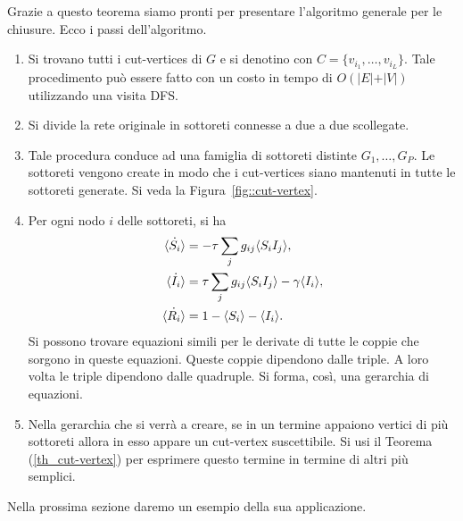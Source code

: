 Grazie a questo teorema siamo pronti per presentare l'algoritmo generale per le chiusure. Ecco i passi dell'algoritmo.
\begin{enumerate}
	\item Si trovano tutti i cut-vertices di $G$ e si denotino con $C=\{ v_{i_1}, \dots, v_{i_L}\}$. Tale procedimento pu\`o essere fatto con  un costo in tempo di $O(\vert E \vert + \vert V \vert)$ utilizzando una visita DFS. 
	\item Si divide la rete originale in sottoreti connesse a due a due scollegate.
	\item Tale procedura conduce ad una famiglia di sottoreti distinte $G_1, \dots, G_P$. Le sottoreti vengono create in modo che i cut-vertices siano mantenuti in tutte le sottoreti generate. Si veda la Figura~\ref{fig::cut-vertex}.
	\item Per ogni nodo $i$ delle sottoreti, si ha 
	\begin{equation*}
	\begin{aligned}
\dot{\langle S_i \rangle} &= -\tau \sum_j g_{ij} \langle S_iI_j \rangle,\\
\dot{\langle I_i \rangle} &= \tau \sum_j g_{ij} \langle S_iI_j \rangle-\gamma\langle I_i \rangle,\\
\dot{\langle R_i \rangle} &= 1 -\langle S_i \rangle -\langle I_i \rangle.
		\end{aligned}
	\end{equation*}
	Si possono trovare  equazioni simili per le derivate di tutte le coppie che sorgono in queste equazioni. Queste coppie dipendono dalle triple. A loro volta le triple dipendono dalle quadruple. Si forma, cos\`i, una gerarchia di equazioni.
	\item Nella gerarchia che si verr\`a a creare, se in un termine appaiono   vertici di pi\`u sottoreti allora in esso appare un cut-vertex suscettibile. Si usi il Teorema (\ref{th_cut-vertex}) per esprimere questo termine    in termine di altri pi\`u semplici.
\end{enumerate}
Nella prossima sezione daremo un esempio della sua applicazione.

\newpage

